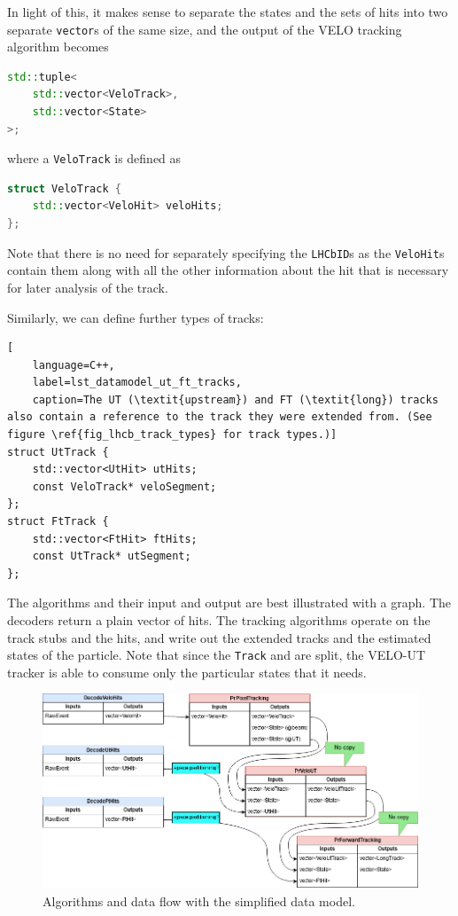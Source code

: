 \documentclass[12pt]{article}
\newcommand{\code}[1]{\texttt{#1}}
\begin{document}
In light of this, it makes sense to separate the states and the sets of hits into two separate \code{vector}s of the same size, and the output of the VELO tracking algorithm becomes
\begin{lstlisting}[language=C++]
std::tuple<
	std::vector<VeloTrack>,
	std::vector<State>
>;
\end{lstlisting}
where a \code{VeloTrack} is defined as 
\begin{lstlisting}[language=C++]
struct VeloTrack {
	std::vector<VeloHit> veloHits;
};
\end{lstlisting}

Note that there is no need for separately specifying the \code{LHCbID}s as the \code{VeloHit}s contain them along with all the other information about the hit that is necessary for later analysis of the track.

\vspace{1pc}

Similarly, we can define further types of tracks:
\begin{lstlisting}[
	language=C++,
	label=lst_datamodel_ut_ft_tracks,
	caption=The UT (\textit{upstream}) and FT (\textit{long}) tracks also contain a reference to the track they were extended from. (See figure \ref{fig_lhcb_track_types} for track types.)]
struct UtTrack {
	std::vector<UtHit> utHits;
	const VeloTrack* veloSegment;
};
struct FtTrack {
	std::vector<FtHit> ftHits;
	const UtTrack* utSegment;
};
\end{lstlisting}

The algorithms and their input and output are best illustrated with a graph. The decoders return a plain vector of hits. The tracking algorithms operate on the track stubs and the hits, and write out the extended tracks and the estimated states of the particle. Note that since the \code{Track} and are split, the VELO-UT tracker is able to consume only the particular states that it needs.

\begin{figure}[H]
	\begin{center}
		\includegraphics[width=1\textwidth]{datamodel_track_flow}
	\end{center}
	\caption{Algorithms and data flow with the simplified data model.}
	\label{fig_datamodel_track_flow}
\end{figure}
\end{document}
